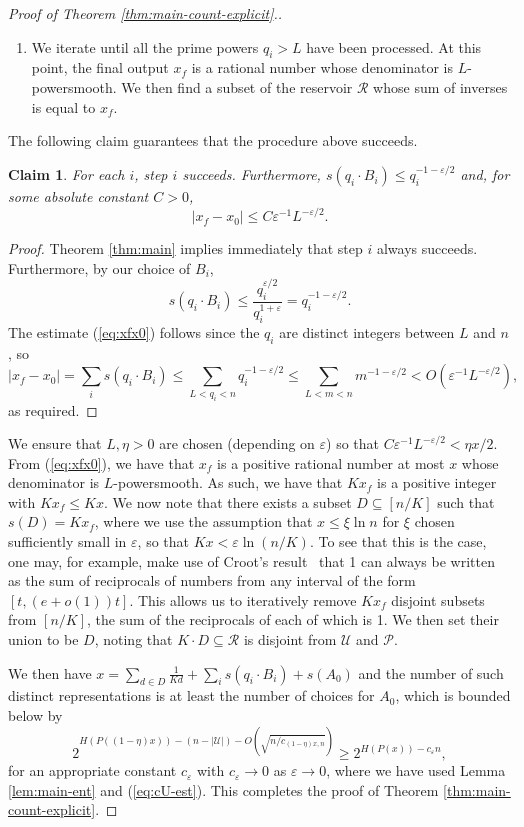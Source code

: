 \documentclass{daj}
\newtheorem{claim}{Claim}
\newcommand{\eps}{\varepsilon}
\newcommand{\cR}{\mathcal{R}}
\newcommand{\cP}{\mathcal{P}}
\newcommand{\cU}{\mathcal{U}}
\begin{document}
\begin{proof}[Proof of Theorem \ref{thm:main-count-explicit}.]
\begin{enumerate}
    \item We iterate until all the prime powers $q_i>L$ have been processed. At this point, the final output $x_{f}$ is a rational number whose denominator is $L$-powersmooth. We then find a subset of the reservoir $\cR$ whose sum of inverses is equal to $x_{f}$.
\end{enumerate}

The following claim guarantees that the procedure above succeeds. 
\begin{claim}
    For each $i$, step $i$ succeeds. Furthermore, $s(q_i\cdot B_i) \le q_i^{-1-\eps/2}$ and,  
    for some absolute constant $C>0$,  
    \begin{equation}\label{eq:xfx0}
        |x_{f}-x_0| \le C\eps^{-1}L^{-\eps/2}. 
    \end{equation}
\end{claim}
\begin{proof}
    Theorem \ref{thm:main} implies immediately that step $i$ always succeeds. Furthermore, by our choice of $B_i$,
    \[
        s(q_i \cdot B_i) \le \frac{q_i^{\eps/2}}{q_i^{1+\eps}} = q_i^{-1-\eps/2}.   
    \]
    The estimate (\ref{eq:xfx0}) follows since the $q_i$ are distinct integers between $L$ and $n$, so 
    \[
        |x_f - x_0| = \sum_i s(q_i \cdot B_i) \le \sum_{L<q_i<n} q_i^{-1-\eps/2} \le \sum_{L<m<n} m^{-1-\eps/2} < O(\eps^{-1}L^{-\eps/2}), 
    \]
    as required.
    \end{proof}

We ensure that $L,\eta>0$ are chosen (depending on $\eps$) so that $C\eps^{-1}L^{-\eps/2} < \eta x/2$. From (\ref{eq:xfx0}), we have that $x_f$ is a positive rational number at most $x$ whose denominator is $L$-powersmooth. As such, we have that $Kx_f$ is a positive integer with $Kx_f \le Kx$. We now note that there exists a subset $D \subseteq [n/K]$ such that $s(D)= K x_f$, where we use the assumption that $x\le \xi \ln n$ for $\xi$ chosen sufficiently small in $\eps$, so that $Kx < \eps \ln(n/K)$. 
To see that this is the case, one may, for example, make use of Croot's result~\cite{C01} that 1 can always be written as the sum of reciprocals of numbers from any interval of the form $[t, (e+o(1))t]$.
This allows us to iteratively remove $K x_f$ disjoint subsets from $[n/K]$, the sum of the reciprocals of each of which is 1.
We then set their union to be $D$, noting that $K\cdot D \subseteq \cR$ is disjoint from $\cU$ and $\cP$. 

We then have $x = \sum_{d\in D}\frac{1}{Kd} + \sum_i s(q_i \cdot B_i) + s(A_0)$ and the number of such distinct representations is at least the number of choices for $A_0$, which is bounded below by 
\[
    2^{H(P((1-\eta)x)) - (n - |\cU|) - O(\sqrt{n/c_{(1-\eta)x,n}})} \ge 2^{H(P(x)) - c_\eps n},
\]
for an appropriate constant $c_\eps$ with $c_\eps \to 0$ as $\eps \to 0$, where we have used Lemma \ref{lem:main-ent} and (\ref{eq:cU-est}). This completes the proof of Theorem \ref{thm:main-count-explicit}. 
\end{proof}
\end{document}
